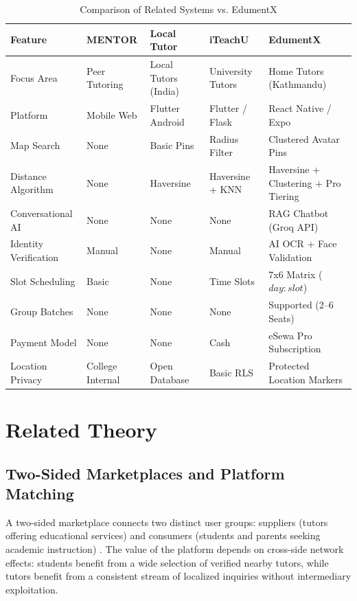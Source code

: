 \documentclass[12pt]{report}
\begin{document}
\begin{table}[H]
\centering
\caption{Comparison of Related Systems vs. EdumentX}
\label{tab:related_work}
\small
\begin{tabular}{|l|p{2.2cm}|p{2.2cm}|p{2.2cm}|p{4.2cm}|}
\hline
\textbf{Feature} & \textbf{MENTOR \cite{Chung2022MENTOR}} & \textbf{Local Tutor \cite{Sharma2026LocalTutor}} & \textbf{iTeachU \cite{Shari2025iTeachU}} & \textbf{EdumentX} \\
\hline
Focus Area & Peer Tutoring & Local Tutors (India) & University Tutors & Home Tutors (Kathmandu) \\
\hline
Platform & Mobile Web & Flutter Android & Flutter / Flask & React Native / Expo \\
\hline
Map Search & None & Basic Pins & Radius Filter & Clustered Avatar Pins \\
\hline
Distance Algorithm & None & Haversine & Haversine + KNN & Haversine + Clustering + Pro Tiering \\
\hline
Conversational AI & None & None & None & RAG Chatbot (Groq API) \\
\hline
Identity Verification & Manual & None & Manual & AI OCR + Face Validation \\
\hline
Slot Scheduling & Basic & None & Time Slots & 7x6 Matrix ($day:slot$) \\
\hline
Group Batches & None & None & None & Supported (2--6 Seats) \\
\hline
Payment Model & None & None & Cash & eSewa Pro Subscription \\
\hline
Location Privacy & College Internal & Open Database & Basic RLS & Protected Location Markers \\
\hline
\end{tabular}
\end{table}

\section{Related Theory}

\subsection{Two-Sided Marketplaces and Platform Matching}
A two-sided marketplace connects two distinct user groups: suppliers (tutors offering educational services) and consumers (students and parents seeking academic instruction) \cite{Rochet2003TwoSided}. The value of the platform depends on cross-side network effects: students benefit from a wide selection of verified nearby tutors, while tutors benefit from a consistent stream of localized inquiries without intermediary exploitation.
\end{document}
